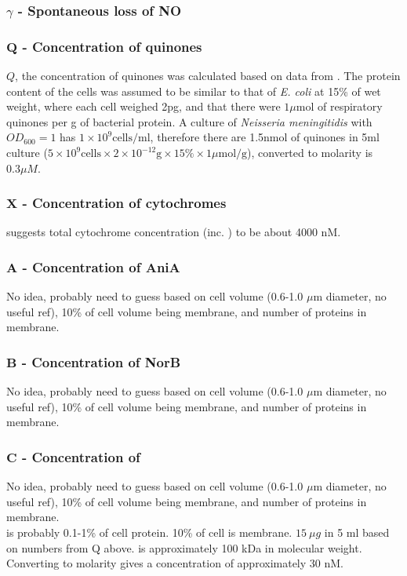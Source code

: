 \subsubsection*{$\gamma$ {\bf- Spontaneous loss of NO}}


\subsubsection*{$\mathbf{Q}$ {\bf- Concentration of quinones}}
$Q$, the concentration of quinones was calculated based on data from \citet{Hedrick1986}. The protein content of the cells was assumed to be similar to that of \textit{E. coli} at 15\% of wet weight, where each cell weighed 2pg, and that there were $1\mu \textrm{mol}$ of respiratory quinones per g of bacterial protein. A culture of \textit{Neisseria meningitidis} with $OD_{600} = 1$ has $1 \times 10^9 \textrm{cells/ml}$, therefore there are 1.5nmol of quinones in 5ml culture ($5\times 10^9 \textrm{cells} \times 2\times 10^{-12} \textrm{g} \times 15\% \times 1\mu\textrm{mol/g}$), converted to molarity is $0.3\mu M$.

\subsubsection*{$\mathbf{X}$ {\bf- Concentration of cytochromes}}
\citet{Deeudom2007} suggests total cytochrome concentration (inc. \cbbthree{}) to be about 4000 nM.

\subsubsection*{$\mathbf{A}$ {\bf- Concentration of AniA}}
No idea, probably need to guess based on cell volume (0.6-1.0 $\mu$m diameter, no useful ref), 10\% of cell volume being membrane, and number of proteins in membrane.

\subsubsection*{$\mathbf{B}$ {\bf- Concentration of NorB}}
No idea, probably need to guess based on cell volume (0.6-1.0 $\mu$m diameter, no useful ref), 10\% of cell volume being membrane, and number of proteins in membrane.

\subsubsection*{$\mathbf{C}$ {\bf- Concentration of \cbbthree{}}}
No idea, probably need to guess based on cell volume (0.6-1.0 $\mu$m diameter, no useful ref), 10\% of cell volume being membrane, and number of proteins in membrane.\\
\cbbthree{} is probably 0.1-1\% of cell protein. 10\% of cell is membrane.
$15~\mu g$ in 5 ml based on numbers from Q above. \cbbthree{} is approximately 100 kDa in molecular weight. Converting to molarity gives a concentration of approximately 30 nM.

